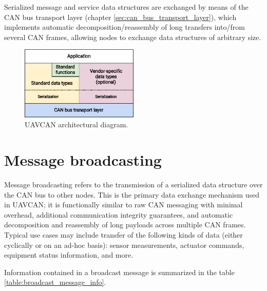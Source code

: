 Serialized message and service data structures are exchanged by means of the CAN bus transport
layer (chapter \ref{sec:can_bus_transport_layer}),
which implements automatic decomposition/reassembly of long transfers into/from several CAN frames,
allowing nodes to exchange data structures of arbitrary size.

\begin{figure}[hbt]
    \centering
	\includegraphics[width=0.5\textwidth]{basic_concepts/Architecture}
	\caption{UAVCAN architectural diagram.\label{fig:architecture}}
\end{figure}

\section{Message broadcasting}

Message broadcasting refers to the transmission of a serialized data structure over the CAN bus to other nodes.
This is the primary data exchange mechanism used in UAVCAN;
it is functionally similar to raw CAN messaging with minimal overhead,
additional communication integrity guarantees, and automatic decomposition and reassembly of long payloads
across multiple CAN frames.
Typical use cases may include transfer of the following kinds of data (either cyclically or on an ad-hoc basis):
sensor measurements, actuator commands, equipment status information, and more.

Information contained in a broadcast message is summarized in the table \ref{table:broadcast_message_info}.


